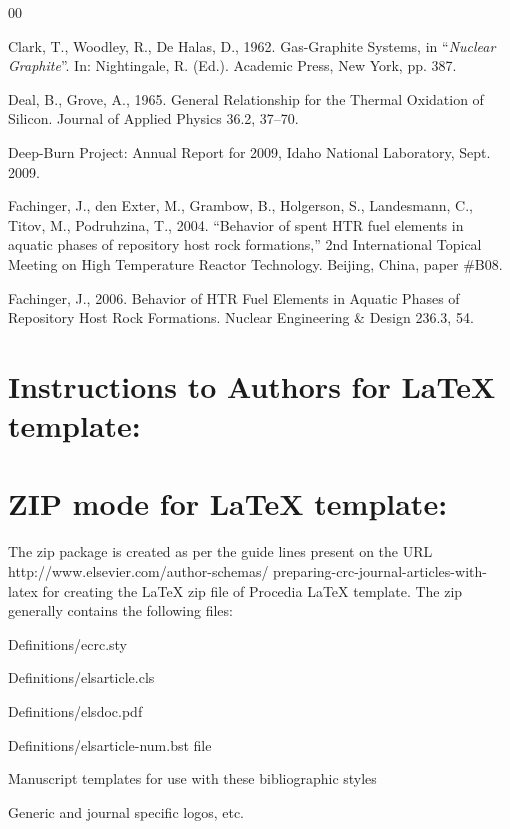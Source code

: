 \documentclass[5p,times,procedia]{Definitions/elsarticle}
\begin{document}
 \begin{thebibliography}{00}


Clark, T., Woodley, R., De Halas, D., 1962. Gas-Graphite Systems, in ``{\it Nuclear Graphite}''. 
In: Nightingale, R. (Ed.). Academic Press, New York, pp. 387.

Deal, B., Grove, A., 1965. General Relationship for the Thermal Oxidation of Silicon. Journal of Applied Physics 36.2, 37--70.

Deep-Burn Project: Annual Report for 2009, Idaho National Laboratory, Sept. 2009.

Fachinger, J., den Exter, M., Grambow, B., Holgerson, S., Landesmann, C., Titov, M., Podruhzina, T., 2004. ``Behavior of spent HTR fuel elements in aquatic phases of repository host rock formations,'' 2nd International Topical Meeting on High Temperature Reactor Technology. Beijing, China, paper \#B08. 

Fachinger, J., 2006. Behavior
of HTR Fuel Elements in Aquatic Phases of Repository Host Rock Formations. Nuclear Engineering \& Design 236.3,      54.

 \end{thebibliography}

\clearpage\onecolumn

\normalMode

\section*{Instructions to Authors for LaTeX template:}

\section{ZIP mode for LaTeX template:}

The zip package is created as per the guide lines present on the URL http://www.elsevier.com/author-schemas/ preparing-crc-journal-articles-with-latex for creating the LaTeX zip file of Procedia LaTeX template.  The zip generally contains the following files:
\begin{Itemize}[]\leftskip-12.7pt
\item Definitions/ecrc.sty
\item  Definitions/elsarticle.cls
\item Definitions/elsdoc.pdf
\item Definitions/elsarticle-num.bst file
\item Manuscript templates for use with these bibliographic styles
\item  Generic and journal specific logos, etc.
\end{Itemize}
\end{document}
